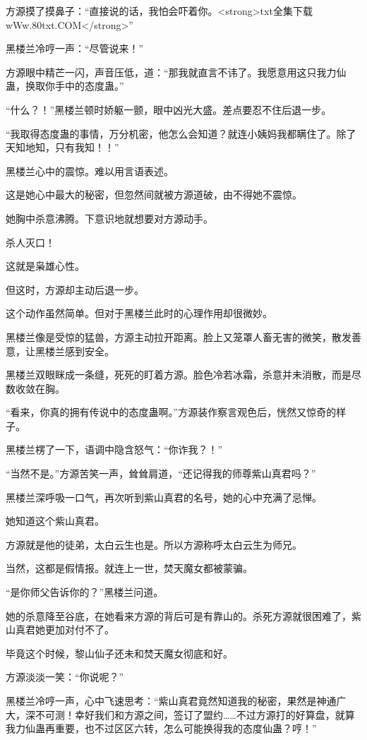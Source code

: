 \begin{this_body}
方源摸了摸鼻子：“直接说的话，我怕会吓着你。<strong>txt全集下载wWw.80txt.COM</strong>”

黑楼兰冷哼一声：“尽管说来！”

方源眼中精芒一闪，声音压低，道：“那我就直言不讳了。我愿意用这只我力仙蛊，换取你手中的态度蛊。”

“什么？！”黑楼兰顿时娇躯一颤，眼中凶光大盛。差点要忍不住后退一步。

“我取得态度蛊的事情，万分机密，他怎么会知道？就连小姨妈我都瞒住了。除了天知地知，只有我知！！”

黑楼兰心中的震惊。难以用言语表述。

这是她心中最大的秘密，但忽然间就被方源道破，由不得她不震惊。

她胸中杀意沸腾。下意识地就想要对方源动手。

杀人灭口！

这就是枭雄心性。

但这时，方源却主动后退一步。

这个动作虽然简单。但对于黑楼兰此时的心理作用却很微妙。

黑楼兰像是受惊的猛兽，方源主动拉开距离。脸上又笼罩人畜无害的微笑，散发善意，让黑楼兰感到安全。

黑楼兰双眼眯成一条缝，死死的盯着方源。脸色冷若冰霜，杀意并未消散，而是尽数收敛在胸。

“看来，你真的拥有传说中的态度蛊啊。”方源装作察言观色后，恍然又惊奇的样子。

黑楼兰楞了一下，语调中隐含怒气：“你诈我？！”

“当然不是。”方源苦笑一声，耸耸肩道，“还记得我的师尊紫山真君吗？”

黑楼兰深呼吸一口气，再次听到紫山真君的名号，她的心中充满了忌惮。

她知道这个紫山真君。

方源就是他的徒弟，太白云生也是。所以方源称呼太白云生为师兄。

当然，这都是假情报。就连上一世，焚天魔女都被蒙骗。

“是你师父告诉你的？”黑楼兰问道。

她的杀意降至谷底，在她看来方源的背后可是有靠山的。杀死方源就很困难了，紫山真君她更加对付不了。

毕竟这个时候，黎山仙子还未和焚天魔女彻底和好。

方源淡淡一笑：“你说呢？”

黑楼兰冷哼一声，心中飞速思考：“紫山真君竟然知道我的秘密，果然是神通广大，深不可测！幸好我们和方源之间，签订了盟约……不过方源打的好算盘，就算我力仙蛊再重要，也不过区区六转，怎么可能换得我的态度仙蛊？哼！”


\end{this_body}
